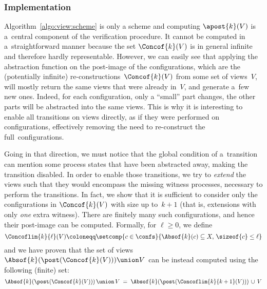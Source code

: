 \subsubsection*{Implementation}
%
%
%
Algorithm~\ref{algo:view:scheme} is only a scheme and computing
$\apost{k}(V)$ is a~central component of the verification procedure.
%
It cannot be computed in a~straightforward manner because the set
$\Concof{k}(V)$ is in general infinite and therefore hardly
representable.
%
However, we can easily see that applying the abstraction function on
the post-image of the configurations, which are the (potentially
infinite) re-constructions~$\Concof{k}(V)$ from some set of views~$V$,
will mostly return the same views that were already in~$V$, and
generate a~few new ones. %
Indeed, for each configuration, only a ``small'' part changes, the
other parts will be abstracted into the same views.
%
This is why it is interesting to enable all transitions on views
directly, as if they were performed on configurations, effectively
removing the need to re-construct the full~configurations.

Going in that direction, we must notice that the global condition of
a~transition can mention some process states that have been abstracted
away, making the transition disabled.
%
%
In order to enable those transitions, we try to \emph{extend} the
views such that they would encompass the missing witness processes,
necessary to perform the transitions.
%
In fact, we show that it is sufficient to consider only the
configurations in $\Concof{k}(V)$ with size up to~$k+1$ (that is,
extensions with only \emph{one} extra witness).
%
There are finitely many such configurations, and hence their
post-image can be computed.
%
Formally, for $\ell\geq 0$, we define %
$$
\Concoflim{k}{\ell}(V)\coloneqq
\setcomp{c\in\confs}{\Absof{k}(c)\subseteq X,\,\sizeof{c}\leq\ell}
$$%
and we have proven that the set of views
$\Absof{k}(\post(\Concof{k}(V)))\union V$ can be instead computed
using the following (finite) set: %
\label{view:abstraction:equation}%
$$\Absof{k}(\post(\Concof{k}(V)))\,\union\,V\;=\;\Absof{k}(\post(\Concoflim{k}{k+1}(V)))\,\cup\,V$$

